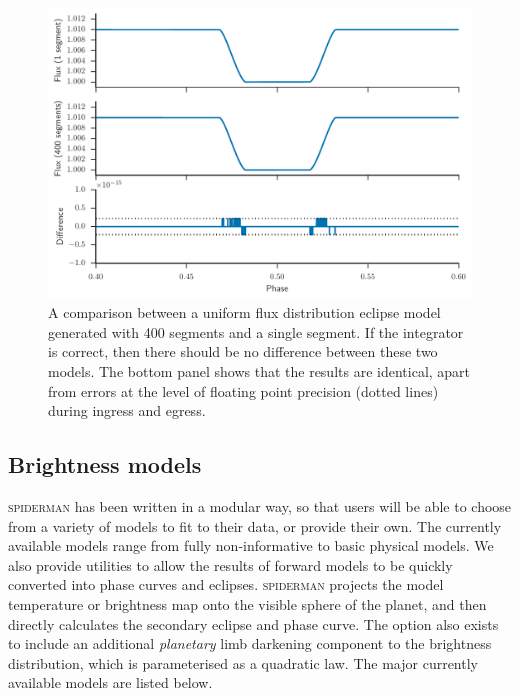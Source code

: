 \documentclass[a4paper,fleqn,usenatbib]{mnras}
\begin{document}
\begin{figure}
\begin{center}
\includegraphics[width=\columnwidth]{img/precision.pdf}
\caption{A comparison between a uniform flux distribution eclipse model generated with 400 segments and a single segment. If the integrator is correct, then there should be no difference between these two models. The bottom panel shows that the results are identical, apart from errors at the level of floating point precision (dotted lines) during ingress and egress.}
\label{fig:precision}
\end{center}
\end{figure}

\subsection{Brightness models}\label{sec:temp model}

\textsc{spiderman} has been written in a modular way, so that users will be able to choose from a variety of models to fit to their data, or provide their own. The currently available models range from fully non-informative to basic physical models. We also provide utilities to allow the results of forward models to be quickly converted into phase curves and eclipses. \textsc{spiderman} projects the model temperature or brightness map onto the visible sphere of the planet, and then directly calculates the secondary eclipse and phase curve. The option also exists to include an additional \emph{planetary} limb darkening component to the brightness distribution, which is parameterised as a quadratic law. The major currently available models are listed below.
\end{document}

